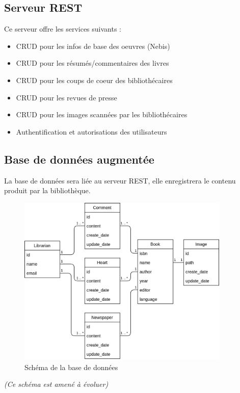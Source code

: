 \documentclass[a4paper, 12pt]{article}
\begin{document}
\subsection{Serveur REST}
Ce serveur offre les services suivants :
\begin{itemize}
    \item CRUD pour les infos de base des oeuvres (Nebis)
    \item CRUD pour les résumés/commentaires des livres
    \item CRUD pour les coups de coeur des bibliothécaires
    \item CRUD pour les revues de presse
    \item CRUD pour les images scannées par les bibliothécaires
    \item Authentification et autorisations des utilisateurs
\end{itemize}

\subsection{Base de données augmentée}
La base de données sera liée au serveur REST, elle enregistrera le contenu produit par la bibliothèque.
\begin{figure}
    \begin{center}
        \includegraphics[width=0.9\textwidth]{images/bdd.png}
    \end{center}
    \caption{Schéma de la base de données}
\end{figure}
\textit{(Ce schéma est amené à évoluer)}
\end{document}

